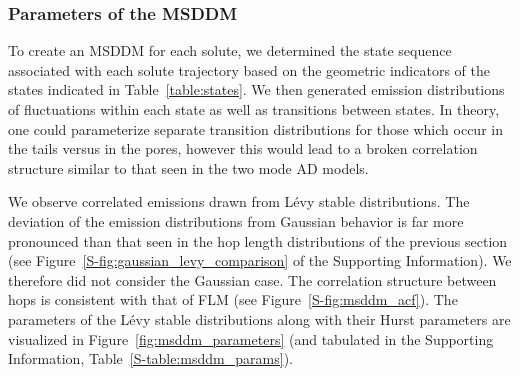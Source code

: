\documentclass[journal=ancac3,manuscript=article,layout=twocolumn]{achemso}
\begin{document}
  \subsubsection{Parameters of the MSDDM}\label{section:msddm_parameterization}

  To create an MSDDM for each solute, we determined the state sequence associated
  with each solute trajectory based on the geometric indicators of the states 
  indicated in Table~\ref{table:states}. We then generated emission distributions of fluctuations
  within each state as well as transitions between states. In theory, one could 
  parameterize separate transition distributions for those which occur in the tails 
  versus in the pores, however this would lead to a broken correlation structure 
  similar to that seen in the two mode AD models.

  We observe correlated emissions drawn from L\'evy stable distributions. The
  deviation of the emission distributions from Gaussian behavior is far more
  pronounced than that seen in the hop length distributions of the previous
  section (see Figure~\ref{S-fig:gaussian_levy_comparison} of the Supporting
  Information). We therefore did not consider the Gaussian case. The correlation
  structure between hops is consistent with that of FLM (see 
  Figure~\ref{S-fig:msddm_acf}). The parameters of the L\'evy stable distributions
  along with their Hurst parameters are visualized in Figure~\ref{fig:msddm_parameters}
  (and tabulated in the Supporting Information, Table~\ref{S-table:msddm_params}). 
  
\end{document}
